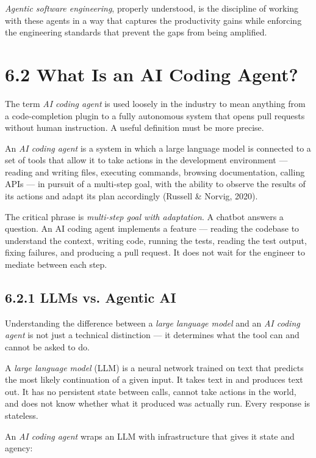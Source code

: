\documentclass[11pt,a4paper]{book}
\begin{document}
\textit{Agentic software engineering}, properly understood, is the discipline of working with these agents in a way that captures the productivity gains while enforcing the engineering standards that prevent the gaps from being amplified.

\medskip

\section{6.2 What Is an AI Coding Agent?}

The term \textit{AI coding agent} is used loosely in the industry to mean anything from a code-completion plugin to a fully autonomous system that opens pull requests without human instruction. A useful definition must be more precise.

An \textit{AI coding agent} is a system in which a large language model is connected to a set of tools that allow it to take actions in the development environment --- reading and writing files, executing commands, browsing documentation, calling APIs --- in pursuit of a multi-step goal, with the ability to observe the results of its actions and adapt its plan accordingly (Russell \& Norvig, 2020).

The critical phrase is \textit{multi-step goal with adaptation}. A chatbot answers a question. An AI coding agent implements a feature --- reading the codebase to understand the context, writing code, running the tests, reading the test output, fixing failures, and producing a pull request. It does not wait for the engineer to mediate between each step.

\subsection{6.2.1 LLMs vs. Agentic AI}

Understanding the difference between a \textit{large language model} and an \textit{AI coding agent} is not just a technical distinction --- it determines what the tool can and cannot be asked to do.

A \textit{large language model} (LLM) is a neural network trained on text that predicts the most likely continuation of a given input. It takes text in and produces text out. It has no persistent state between calls, cannot take actions in the world, and does not know whether what it produced was actually run. Every response is stateless.

An \textit{AI coding agent} wraps an LLM with infrastructure that gives it state and agency:
\end{document}
